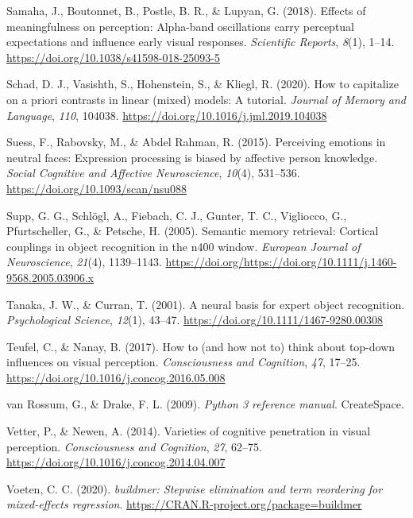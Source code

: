 \documentclass[
  english,
  man,floatsintext]{apa7}
\begin{document}
\leavevmode\hypertarget{ref-samaha2018}{}%
Samaha, J., Boutonnet, B., Postle, B. R., \& Lupyan, G. (2018). Effects of meaningfulness on perception: Alpha-band oscillations carry perceptual expectations and influence early visual responses. \emph{Scientific Reports}, \emph{8}(1), 1--14. \url{https://doi.org/10.1038/s41598-018-25093-5}

\leavevmode\hypertarget{ref-schad2020}{}%
Schad, D. J., Vasishth, S., Hohenstein, S., \& Kliegl, R. (2020). How to capitalize on a priori contrasts in linear (mixed) models: A tutorial. \emph{Journal of Memory and Language}, \emph{110}, 104038. \url{https://doi.org/10.1016/j.jml.2019.104038}

\leavevmode\hypertarget{ref-suess2015}{}%
Suess, F., Rabovsky, M., \& Abdel Rahman, R. (2015). Perceiving emotions in neutral faces: Expression processing is biased by affective person knowledge. \emph{Social Cognitive and Affective Neuroscience}, \emph{10}(4), 531--536. \url{https://doi.org/10.1093/scan/nsu088}

\leavevmode\hypertarget{ref-supp2005}{}%
Supp, G. G., Schlögl, A., Fiebach, C. J., Gunter, T. C., Vigliocco, G., Pfurtscheller, G., \& Petsche, H. (2005). Semantic memory retrieval: Cortical couplings in object recognition in the n400 window. \emph{European Journal of Neuroscience}, \emph{21}(4), 1139--1143. \url{https://doi.org/https://doi.org/10.1111/j.1460-9568.2005.03906.x}

\leavevmode\hypertarget{ref-tanaka2001}{}%
Tanaka, J. W., \& Curran, T. (2001). A neural basis for expert object recognition. \emph{Psychological Science}, \emph{12}(1), 43--47. \url{https://doi.org/10.1111/1467-9280.00308}

\leavevmode\hypertarget{ref-teufel2017}{}%
Teufel, C., \& Nanay, B. (2017). How to (and how not to) think about top-down influences on visual perception. \emph{Consciousness and Cognition}, \emph{47}, 17--25. \url{https://doi.org/10.1016/j.concog.2016.05.008}

\leavevmode\hypertarget{ref-vanrossum2009}{}%
van Rossum, G., \& Drake, F. L. (2009). \emph{Python 3 reference manual}. CreateSpace.

\leavevmode\hypertarget{ref-vetter2014}{}%
Vetter, P., \& Newen, A. (2014). Varieties of cognitive penetration in visual perception. \emph{Consciousness and Cognition}, \emph{27}, 62--75. \url{https://doi.org/10.1016/j.concog.2014.04.007}

\leavevmode\hypertarget{ref-R-buildmer}{}%
Voeten, C. C. (2020). \emph{buildmer: Stepwise elimination and term reordering for mixed-effects regression}. \url{https://CRAN.R-project.org/package=buildmer}
\end{document}
